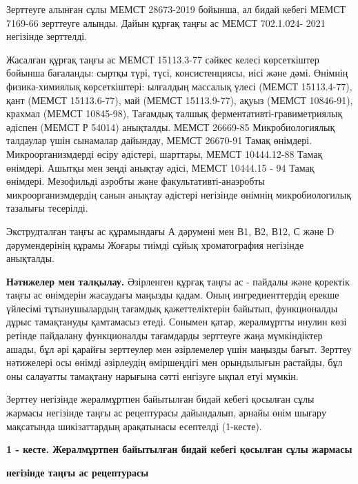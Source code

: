 Зерттеуге алынған сұлы МЕМСТ 28673-2019 бойынша, ал бидай кебегі МЕМСТ
7169-66 зерттеуге алынды. Дайын құрғақ таңғы ас МЕМСТ 702.1.024- 2021
негізінде зерттелді.

Жасалған құрғақ таңғы ас МЕМСТ 15113.3-77 сәйкес келесі көрсеткіштер
бойынша бағаланды: сыртқы түрі, түсі, консистенциясы, иісі және дәмі.
Өнімнің физика-химиялық көрсеткіштері: ылғалдың массалық үлесі (МЕМСТ
15113.4-77), қант (МЕМСТ 15113.6-77), май (МЕМСТ 15113.9-77), ақуыз
(МЕМСТ 10846-91), крахмал (МЕМСТ 10845-98), Тағамдық талшық
ферментативті-гравиметриялық әдіспен (МЕМСТ Р 54014) анықталды. МЕМСТ
26669-85 Микробиологиялық талдаулар үшін сынамалар дайындау, МЕМСТ
26670-91 Тамақ өнімдері. Микроорганизмдерді өсіру әдістері, шарттары,
МЕМСТ 10444.12-88 Тамақ өнімдері. Ашытқы мен зеңді анықтау әдісі, МЕМСТ
10444.15 - 94 Тамақ өнімдері. Мезофильді аэробты және
факультативті-анаэробты микроорганизмдердің санын анықтау әдістері
негізінде өнімнің микробиологилық тазалығы тесерілді.

Экструдталған таңғы ас құрамындағы А дәрумені мен В1, В2, В12, С және D
дәрумендерінің құрамы Жоғары тиімді сұйық хроматография негізінде
анықталды.

{\bfseries Нәтижелер мен талқылау.} Әзірленген құрғақ таңғы ас - пайдалы
және қоректік таңғы ас өнімдерін жасаудағы маңызды қадам. Оның
ингредиенттердің ерекше үйлесімі тұтынушылардың тағамдық қажеттеліктерін
байытып, функционалды дұрыс тамақтануды қамтамасыз етеді. Сонымен қатар,
жералмұртты инулин көзі ретінде пайдалану функционалды тағамдарды
зерттеуге жаңа мүмкіндіктер ашады, бұл әрі қарайғы зерттеулер мен
әзірлемелер үшін маңызды бағыт. Зерттеу нәтижелері осы өнімді әзірлеудің
өміршеңдігі мен орындылығын растайды, бұл оны салауатты тамақтану
нарығына сәтті енгізуге ықпал етуі мүмкін.

Зерттеу негізінде жералмұртпен байытылған бидай кебегі қосылған сұлы
жармасы негізінде таңғы ас рецептурасы дайындалып, арнайы өнім шығару
мақсатында шикізаттардың арақатынасы есептелді (1-кесте).

{\bfseries 1 - кесте. Жералмұртпен байытылған бидай кебегі қосылған сұлы
жармасы}

{\bfseries негізінде таңғы ас рецептурасы}

